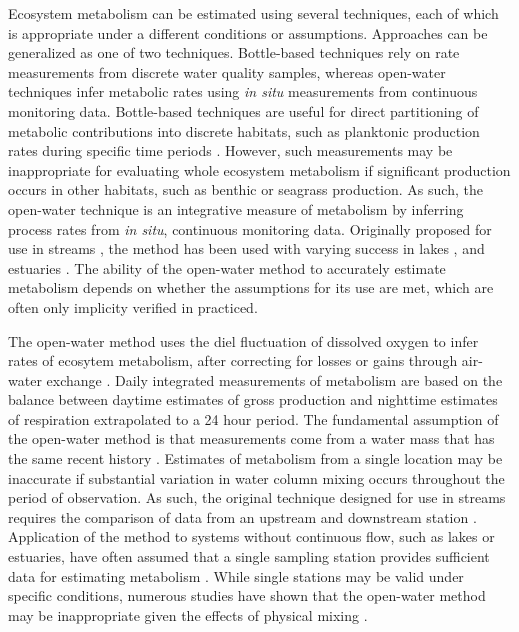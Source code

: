 Ecosystem metabolism can be estimated using several techniques, each of which is appropriate under a different conditions or assumptions.  Approaches can be generalized as one of two techniques.  Bottle-based techniques rely on rate measurements from discrete water quality samples, whereas open-water techniques infer metabolic rates using \textit{in situ} measurements from continuous monitoring data.  Bottle-based techniques are useful for direct partitioning of metabolic contributions into discrete habitats, such as planktonic production rates during specific time periods \citep{Kemp12}.  However, such measurements may be inappropriate for evaluating whole ecosystem metabolism if significant production occurs in other habitats, such as benthic or seagrass production.  As such, the open-water technique is an integrative measure of metabolism by inferring process rates from \textit{in situ}, continuous monitoring data.  Originally proposed for use in streams \citep{Odum56}, the method has been used with varying success in lakes \citep{Staehr10,Coloso11,Batt12}, and estuaries \citep{Caffrey04,Hopkinson05,Caffrey13}.  The ability of the open-water method to accurately estimate metabolism depends on whether the assumptions for its use are met, which are often only implicity verified in practiced. 

The open-water method uses the diel fluctuation of dissolved oxygen to infer rates of ecosytem metabolism, after correcting for losses or gains through air-water exchange \citep{Kemp12}.  Daily integrated measurements of metabolism are based on the balance between daytime estimates of gross production and nighttime estimates of respiration extrapolated to a 24 hour period.  The fundamental assumption of the open-water method is that measurements come from a water mass that has the same recent history \citep{Needoba12}.  Estimates of metabolism from a single location may be inaccurate if substantial variation in water column mixing occurs throughout the period of observation.  As such, the original technique designed for use in streams requires the comparison of data from an upstream and downstream station \citep{Odum56}.  Application of the method to systems without continuous flow, such as lakes or estuaries, have often assumed that a single sampling station provides sufficient data for estimating metabolism \cite{Staehr10}.  While single stations may be valid under specific conditions, numerous studies have shown that the open-water method may be inappropriate given the effects of physical mixing \citep{Ziegler98,Caffrey03,Coloso11,Batt12,Nidzieko14}.


